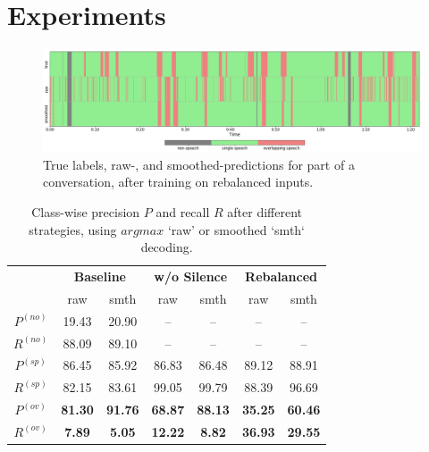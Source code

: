 \documentclass[a4paper]{article}
\begin{document}
\section{Experiments} \label{sec:eval}

\begin{figure}[t] \label{fig:raw-smth-preds}
  \centering
  \includegraphics[width=0.8\linewidth]{figures/raw-smth-preds.png}
  \caption{True labels, raw-, and smoothed-predictions for part of a conversation, after training on rebalanced inputs.}
  \vspace*{-\baselineskip}
\end{figure}

\begin{table}[t] \label{tbl:results}
  \caption{Class-wise precision $P$ and recall $R$ after different strategies, using $argmax$ `raw' or smoothed `smth` decoding.}
  \centering
  \begin{tabular}{ccccccc}
    \toprule
                & \multicolumn{2}{c}{\textbf{Baseline}}  & \multicolumn{2}{c}{\textbf{w/o Silence}}   & \multicolumn{2}{c}{\textbf{Rebalanced}}   \\
                &         raw      &         smth        &         raw      &         smth            &         raw      &         smth           \\ \midrule
    $P^{(no)}$  &         19.43    &         20.90       &         --       &         --              &         --       &         --             \\
    $R^{(no)}$  &         88.09    &         89.10       &         --       &         --              &         --       &         --             \\ \midrule
    $P^{(sp)}$  &         86.45    &         85.92       &         86.83    &         86.48           &         89.12    &         88.91          \\
    $R^{(sp)}$  &         82.15    &         83.61       &         99.05    &         99.79           &         88.39    &         96.69          \\ \midrule
    $P^{(ov)}$  & \textbf{81.30}   & \textbf{91.76}      & \textbf{68.87}   & \textbf{88.13}          & \textbf{35.25}   & \textbf{60.46}         \\
    $R^{(ov)}$  & \textbf{ 7.89}   & \textbf{ 5.05}      & \textbf{12.22}   & \textbf{ 8.82}          & \textbf{36.93}   & \textbf{29.55}         \\
    \bottomrule
  \end{tabular}
  \vspace*{-\baselineskip}
\end{table}
\end{document}
